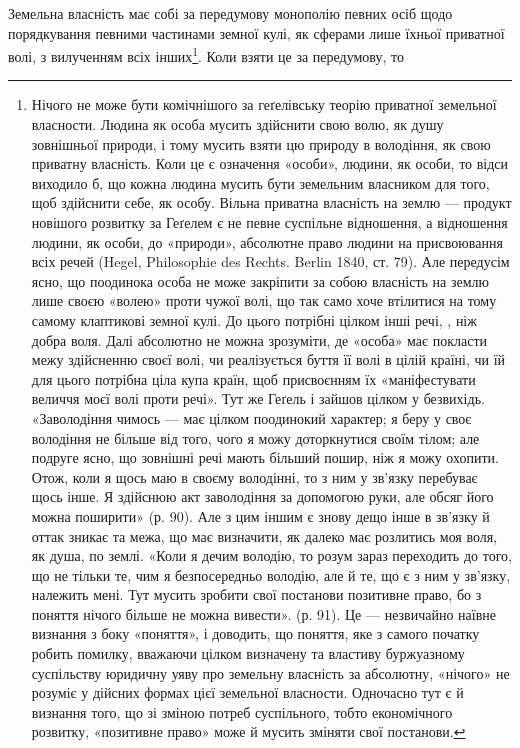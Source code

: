 Земельна власність має собі за передумову монополію певних осіб щодо
порядкування певними частинами земної кулі, як сферами лише їхньої приватної
волі, з вилученням всіх інших\footnote{
Нічого не може бути комічнішого за геґелівську теорію приватної земельної власности. Людина
як особа мусить здійснити свою волю, як душу зовнішньої природи, і тому мусить взяти цю
природу в володіння, як свою приватну власність. Коли це є означення «особи», людини, як особи,
то відси виходило б, що кожна людина мусить бути земельним власником для того, щоб здійснити себе,
як особу. Вільна приватна власність на землю — продукт новішого розвитку за Геґелем є не певне
суспільне відношення, а відношення людини, як особи, до «природи», абсолютне право людини на
присвоювання
всіх речей (Hegel, Philosophie des Rechts. Berlin 1840, ст. 79). Але передусім ясно, що поодинока
особа не може закріпити за собою власність на землю лише своєю «волею» проти чужої волі, що
так само хоче втілитися на тому самому клаптикові земної кулі. До цього потрібні цілком інші речі, ,
ніж добра воля. Далі абсолютно не можна зрозуміти, де «особа» має покласти межу здійсненню своєї
волі, чи реалізується буття її волі в цілій країні, чи їй для цього потрібна ціла купа країн, щоб
присвоєнням
їх «маніфестувати величчя моєї волі проти речі». Тут же Геґель і зайшов цілком у безвихідь.
«Заволодіння чимось — має цілком поодинокий характер; я беру у своє володіння не більше від того,
чого
я можу доторкнутися своїм тілом; але подруге ясно, що зовнішні речі мають більший пошир, ніж
я можу охопити. Отож, коли я щось маю в своєму володінні, то з ним у зв’язку перебуває щось інше.
Я здійснюю акт заволодіння за допомогою руки, але обсяг його можна поширити» (р. 90). Але з цим
іншим є знову дещо інше в зв’язку й оттак зникає та межа, що має визначити, як далеко має розлитись
моя воля, як душа, по землі. «Коли я дечим володію, то розум зараз переходить до того, що не
тільки те, чим я безпосередньо володію, але й те, що є з ним у зв'язку, належить мені. Тут мусить
зробити свої постанови позитивне право, бо з поняття нічого більше не можна вивести». (р. 91). Це —
незвичайно наївне визнання з боку «поняття», і доводить, що поняття, яке з самого початку робить
помилку, вважаючи цілком визначену та властиву буржуазному суспільству юридичну уяву про земельну
власність за абсолютну, «нічого» не розуміє у дійсних формах цієї земельної власности. Одночасно тут
є й визнання того, що зі зміною потреб суспільного, тобто економічного розвитку, «позитивне право»
може й мусить зміняти свої постанови.
}. Коли взяти це за передумову, то
